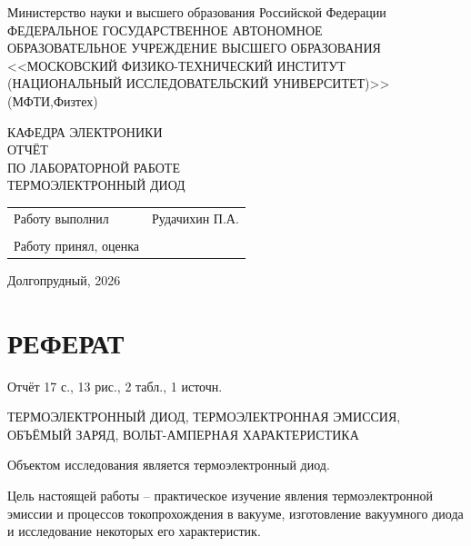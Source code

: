 \documentclass[a4paper, 14pt]{extarticle}
\begin{document}
	
	\begin{titlepage}
		\centering
		{ Министерство науки и высшего образования Российской Федерации\\
		ФЕДЕРАЛЬНОЕ ГОСУДАРСТВЕННОЕ АВТОНОМНОЕ \\
		ОБРАЗОВАТЕЛЬНОЕ УЧРЕЖДЕНИЕ ВЫСШЕГО ОБРАЗОВАНИЯ \\
		<<МОСКОВСКИЙ ФИЗИКО-ТЕХНИЧЕСКИЙ ИНСТИТУТ\\
		(НАЦИОНАЛЬНЫЙ ИССЛЕДОВАТЕЛЬСКИЙ УНИВЕРСИТЕТ)>>\\
		(МФТИ,Физтех)
		}
		
		\vspace{6cm}
		
		КАФЕДРА ЭЛЕКТРОНИКИ\\
		\vspace{0.5cm}
		ОТЧЁТ \\
		ПО ЛАБОРАТОРНОЙ РАБОТЕ\\
		\vspace{0.5cm}
		{{ТЕРМОЭЛЕКТРОННЫЙ ДИОД}\\}
		
		\vspace{5cm}
		
		\begin{tabular}{ll}
			Работу выполнил & \underline{\hspace{5cm}} Рудачихин П.А.  \\
			&\\
			Работу принял, оценка & \underline{\hspace{9cm}} \\
		\end{tabular}
		\centering
		
		
		\vfill
		
		Долгопрудный, 2026
	\end{titlepage}
	
	\section*{РЕФЕРАТ}
	
	\hspace{11mm} Отчёт 17 с., 13 рис.,  2 табл.,  1 источн.
	
	ТЕРМОЭЛЕКТРОННЫЙ ДИОД, ТЕРМОЭЛЕКТРОННАЯ ЭМИССИЯ, ОБЪЁМЫЙ ЗАРЯД, ВОЛЬТ-АМПЕРНАЯ ХАРАКТЕРИСТИКА
	
	Объектом исследования является термоэлектронный диод.
	
	Цель настоящей работы -- практическое изучение явления термоэлектронной эмиссии и процессов токопрохождения в вакууме, изготовление вакуумного диода и исследование некоторых его характеристик. 
	
\end{document}
